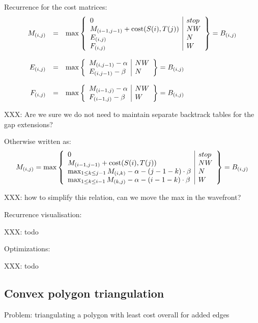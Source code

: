 \documentclass[11pt]{article}
\begin{document}
Recurrence for the cost matrices:
\[\begin{array}{rcl}
M_{(i,j)}&=&\max\left\{\begin{array}{l|l}
	0 & stop\\
	M_{(i-1,j-1)}+{\rm cost}(S(i),T(j)) & NW\\
	E_{(i,j)} & N\\
	F_{(i,j)} & W
\end{array}\right\}=B_{(i,j)}\\
\\
E_{(i,j)}&=&\max\left\{\begin{array}{l|l}
	M_{(i, j-1)} - \alpha & NW\\
	E_{(i,j-1)} - \beta & N\\
\end{array}\right\}=B_{(i,j)}\\
\\
F_{(i,j)}&=&\max\left\{\begin{array}{l|l}
	M_{(i-1,j)} - \alpha & NW\\
	F_{(i-1,j)} - \beta & W\\
\end{array}\right\}=B_{(i,j)}
\end{array}\]

{\color{red} XXX: Are we sure we do not need to maintain separate backtrack tables for the gap extensions?}


Otherwise written as:
\[M_{(i,j)}=\max\left\{\begin{array}{l|l}
	0 & stop\\
	M_{(i-1,j-1)}+{\rm cost}(S(i),T(j)) & NW\\
	\max_{1 \le k \le j-1} M_{(i,k)} - \alpha - (j-1-k) \cdot \beta & N\\
	\max_{1 \le k \le i-1} M_{(k,j)} - \alpha - (i-1-k) \cdot \beta & W\\
\end{array}\right\}=B_{(i,j)} \]

{\color{red} XXX: how to simplify this relation, can we move the max in the wavefront?}

Recurrence visualisation:

{\color{red} XXX: todo}

Optimizations:

{\color{red} XXX: todo}

\newpage
\subsection{Convex polygon triangulation}
Problem: triangulating a polygon with least cost overall for added edges
\end{document}

